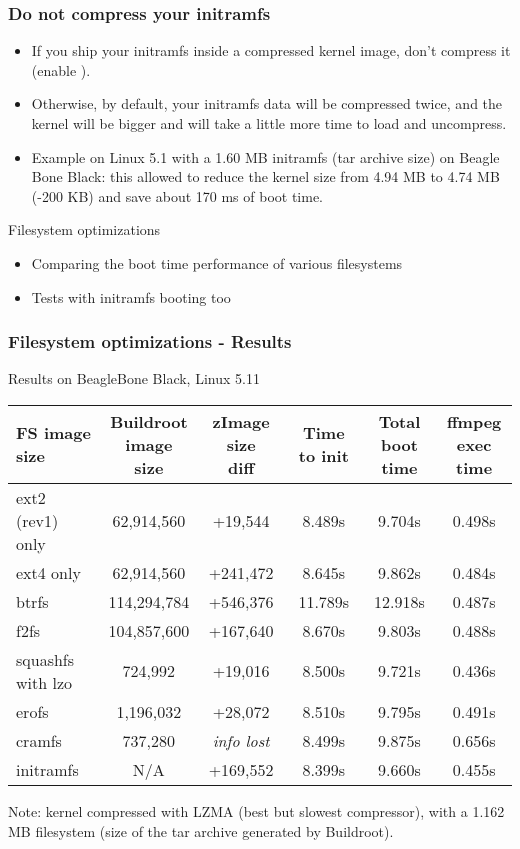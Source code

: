 \begin{frame}
\frametitle{Do not compress your initramfs}
\begin{itemize}
\item If you ship your initramfs inside a compressed kernel image, don't compress
      it \\
      (enable ).
\item Otherwise, by default, your initramfs data will be compressed twice, and
      the kernel will be bigger and will take a little more time to load
      and uncompress.
\item Example on Linux 5.1 with a 1.60 MB initramfs (tar archive size)
      on Beagle Bone Black: this allowed to reduce the kernel size from 4.94
      MB to 4.74 MB (-200 KB) and save about 170 ms of boot time.
\end{itemize}
\end{frame}

\setuplabframe
{Filesystem optimizations}
{
\begin{itemize}
\item Comparing the boot time performance of various filesystems
\item Tests with initramfs booting too
\end{itemize}
}

\begin{frame}
\frametitle{Filesystem optimizations - Results}
Results on BeagleBone Black, Linux 5.11
\small
\begin{tabular}{| l || c | c | c | c | c |}
\hline
FS image size & \makecell{Buildroot\\ image size} & \makecell{zImage
size\\ diff} & Time to init & \makecell{Total\\ boot time} & \makecell{ffmpeg\\ exec
time}\\
\hline
ext2 (rev1) only & 62,914,560 & +19,544 & 8.489s & 9.704s & 0.498s \\
\hline
ext4 only & 62,914,560 & +241,472 & 8.645s & 9.862s & 0.484s \\
\hline
btrfs & 114,294,784 & +546,376 & 11.789s & 12.918s & 0.487s \\
\hline
f2fs & 104,857,600 & +167,640 & 8.670s & 9.803s & 0.488s \\
\hline
squashfs with lzo & 724,992 & +19,016 & 8.500s & 9.721s & 0.436s \\
\hline
erofs & 1,196,032 & +28,072 & 8.510s & 9.795s & 0.491s \\
\hline
cramfs & 737,280 & {\em info lost} & 8.499s & 9.875s & 0.656s \\
\hline
initramfs & N/A & +169,552 & 8.399s & 9.660s & 0.455s \\
\hline
\end{tabular}
\vfill
Note:  kernel compressed with LZMA (best but slowest
compressor), with a 1.162 MB filesystem (size of the tar archive
generated by Buildroot).
\end{frame}

